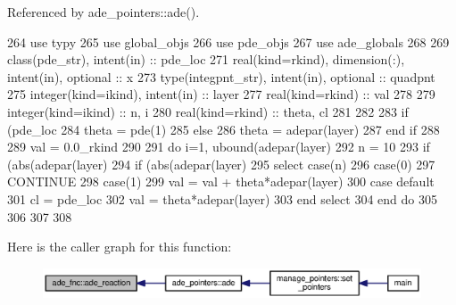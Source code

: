 Referenced by ade\+\_\+pointers\+::ade().


\begin{DoxyCode}
264       \textcolor{keywordtype}{use }typy
265       \textcolor{keywordtype}{use }global_objs
266       \textcolor{keywordtype}{use }pde_objs
267       \textcolor{keywordtype}{use }ade_globals
268       
269       \textcolor{keywordtype}{class}(pde_str), \textcolor{keywordtype}{intent(in)} :: pde\_loc
271       \textcolor{keywordtype}{real(kind=rkind)}, \textcolor{keywordtype}{dimension(:)}, \textcolor{keywordtype}{intent(in)}, \textcolor{keywordtype}{optional}    :: x
273       \textcolor{keywordtype}{type}(integpnt_str), \textcolor{keywordtype}{intent(in)}, \textcolor{keywordtype}{optional} :: quadpnt
275       \textcolor{keywordtype}{integer(kind=ikind)}, \textcolor{keywordtype}{intent(in)} :: layer
277       \textcolor{keywordtype}{real(kind=rkind)}                :: val 
278       
279       \textcolor{keywordtype}{integer(kind=ikind)} :: n, i
280       \textcolor{keywordtype}{real(kind=rkind)} :: theta, cl
281       
282      
283       \textcolor{keywordflow}{if} (pde\_loc%
284         theta = pde(1)%
285       \textcolor{keywordflow}{else}
286         theta = adepar(layer)%
287 \textcolor{keywordflow}{      end if}
288       
289       val = 0.0\_rkind
290       
291       \textcolor{keywordflow}{do} i=1, ubound(adepar(layer)%
292         n = 10
293         \textcolor{keywordflow}{if} (abs(adepar(layer)%
294 \textcolor{comment}{        }\textcolor{keywordflow}{if} (abs(adepar(layer)%
295         \textcolor{keywordflow}{select case}(n)
296           \textcolor{keywordflow}{case}(0)
297             \textcolor{keywordflow}{CONTINUE}
298           \textcolor{keywordflow}{case}(1)
299             val = val + theta*adepar(layer)%
300 \textcolor{keywordflow}{          case default}
301             cl = pde\_loc%
302             val = theta*adepar(layer)%
303 \textcolor{keywordflow}{        end select}
304 \textcolor{keywordflow}{      end do}
305         
306           
307       
308       
\end{DoxyCode}


Here is the caller graph for this function\+:\nopagebreak
\begin{figure}[H]
\begin{center}
\leavevmode
\includegraphics[width=350pt]{namespaceade__fnc_a68093fda9691ff2d4e6095af69b410f3_icgraph}
\end{center}
\end{figure}


